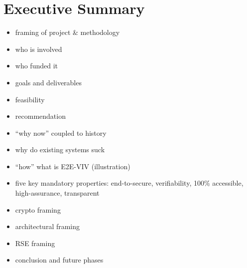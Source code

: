 \chapter{Executive Summary}
\label{chapter:executive_summary}

\begin{itemize}
\item framing of project \& methodology
\item who is involved
\item who funded it
\item goals and deliverables
\item feasibility
\item recommendation
\item ``why now'' coupled to history
\item why do existing systems suck
\item ``how'' what is E2E-VIV (illustration)
\item five key mandatory properties: end-to-secure, verifiability,
  100\% accessible, high-assurance, transparent
\item crypto framing
\item architectural framing
\item RSE framing
\item conclusion and future phases
\end{itemize}







